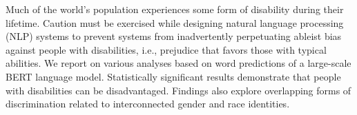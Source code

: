 Much of the world's population experiences some form of disability during their lifetime. Caution must be exercised while designing natural language processing (NLP) systems to prevent systems from inadvertently perpetuating ableist bias against people with disabilities, i.e., prejudice that favors those with typical abilities. We report on various analyses based on word predictions of a large-scale BERT language model. Statistically significant results demonstrate that people with disabilities can be disadvantaged. Findings also explore overlapping forms of discrimination related to interconnected gender and race identities.
